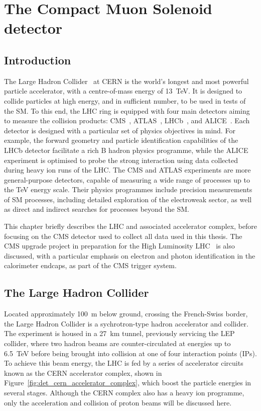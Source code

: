 \chapter{The Compact Muon Solenoid detector}
\label{chap:detector}

\section{Introduction}


The Large Hadron Collider~\cite{LHCTDR} at CERN is the world's longest and most powerful particle accelerator, with a centre-of-mass energy of 13~TeV. It is designed to collide particles at high energy, and in sufficient number, to be used in tests of the SM. To this end, the LHC ring is equipped with four main detectors aiming to measure the collision products: CMS~\cite{CMS}, ATLAS~\cite{ATLAS}, LHCb~\cite{LHCb}, and ALICE~\cite{ALICE}. Each detector is designed with a particular set of physics objectives in mind. For example, the forward geometry and particle identification capabilities of the LHCb detector facilitate a rich B hadron physics programme, while the ALICE experiment is optimised to probe the strong interaction using data collected during heavy ion runs of the LHC. %
The CMS and ATLAS experiments are more general-purpose detectors, capable of measuring a wide range of processes up to the TeV energy scale. Their physics programmes include precision measurements of SM processes, including detailed exploration of the electroweak sector, as well as direct and indirect searches for processes beyond the SM.

This chapter briefly describes the LHC and associated accelerator complex, before focusing on the CMS detector used to collect all data used in this thesis. The CMS upgrade project in preparation for the High Luminosity LHC~\cite{CMS_phase2_TDR} is also discussed, with a particular emphasis on electron and photon identification in the calorimeter endcaps, as part of the CMS trigger system.

\section{The Large Hadron Collider}

Located approximately 100~m below ground, crossing the French-Swiss border, the Large Hadron Collider is a sychrotron-type hadron accelerator and collider. The experiment is housed in a 27~km tunnel, previously servicing the LEP~\cite{LEPTDR} collider, where two hadron beams are counter-circulated at energies up to 6.5~TeV before being brought into collision at one of four interaction points (IPs). To achieve this beam energy, the LHC is fed by a series of accelerator circuits known as the CERN accelerator complex, shown in Figure~\ref{fig:det_cern_accelerator_complex}, which boost the particle energies in several stages. Although the CERN complex also has a heavy ion programme, only the acceleration and collision of proton beams will be discussed here.

